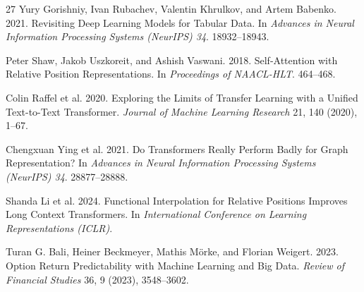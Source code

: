 \documentclass[sigconf,review,anonymous]{acmart}
\begin{document}
\begin{thebibliography}{27}
Yury Gorishniy, Ivan Rubachev, Valentin Khrulkov, and Artem Babenko. 2021. Revisiting Deep Learning Models for Tabular Data. In \textit{Advances in Neural Information Processing Systems (NeurIPS) 34}. 18932--18943.

Peter Shaw, Jakob Uszkoreit, and Ashish Vaswani. 2018. Self-Attention with Relative Position Representations. In \textit{Proceedings of NAACL-HLT}. 464--468.

Colin Raffel et al. 2020. Exploring the Limits of Transfer Learning with a Unified Text-to-Text Transformer. \textit{Journal of Machine Learning Research} 21, 140 (2020), 1--67.

Chengxuan Ying et al. 2021. Do Transformers Really Perform Badly for Graph Representation? In \textit{Advances in Neural Information Processing Systems (NeurIPS) 34}. 28877--28888.

Shanda Li et al. 2024. Functional Interpolation for Relative Positions Improves Long Context Transformers. In \textit{International Conference on Learning Representations (ICLR)}.

Turan G. Bali, Heiner Beckmeyer, Mathis M\"orke, and Florian Weigert. 2023. Option Return Predictability with Machine Learning and Big Data. \textit{Review of Financial Studies} 36, 9 (2023), 3548--3602.

\end{thebibliography}
\endgroup
\end{document}
